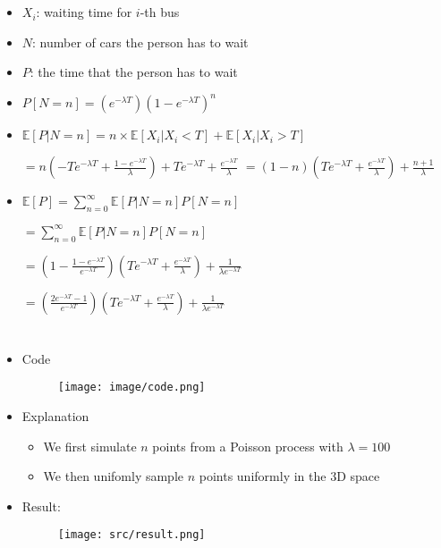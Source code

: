 \documentclass[a4paper]{article}
\begin{document}
\section{}
\begin{itemize}
\begin{figure} [H]
    \texttt{[image: question/4.png]}
\end{figure}
    \item $X_i$: waiting time for $i$-th bus
    \item $N$: number of cars the person has to wait
    \item $P$: the time that the person has to wait
    \item $P[N=n] = (e^{-\lambda T})(1-e^{-\lambda T})^n$
    \item $\mathbb{E}[P|N=n] = n \times \mathbb{E}[X_i|X_i < T] + \mathbb{E}[X_i|X_i>T]$

        $= n(-Te^{-\lambda T} + \frac{1-e^{-\lambda T}}{\lambda}) + Te^{-\lambda T} + \frac{e^{-\lambda T}}{\lambda}$
        $= (1-n)(Te^{-\lambda T} + \frac{e^{-\lambda T}}{\lambda}) + \frac{n+1}{\lambda}$
    \item $\mathbb{E}[P] = \sum_{n = 0}^\infty \mathbb{E}[P|N=n] P[N=n]$

        $= \sum_{n = 0}^\infty \mathbb{E}[P|N=n] P[N=n]$

        $= (1-\frac{1-e^{-\lambda T}}{e^{-\lambda T}})(Te^{-\lambda T} + \frac{e^{-\lambda T}}{\lambda}) + \frac{1}{\lambda e^{-\lambda T}}$

        $= (\frac{2e^{-\lambda T} - 1}{e^{-\lambda T}})(Te^{-\lambda T} + \frac{e^{-\lambda T}}{\lambda}) + \frac{1}{\lambda e^{-\lambda T}}$
\end{itemize}

\section{}
\begin{itemize}
\begin{figure} [H]
    \texttt{[image: question/5.png]}
\end{figure}
    \item Code
\begin{figure} [H]
    \texttt{[image: image/code.png]}
\end{figure}
    \item Explanation
        \begin{itemize}
            \item We first simulate $n$ points from a Poisson process with $\lambda = 100$
            \item We then unifomly sample $n$ points uniformly in the 3D space
        \end{itemize}
    \item Result:
\begin{figure} [H]
    \texttt{[image: src/result.png]}
\end{figure}
\end{itemize}
\end{document}
